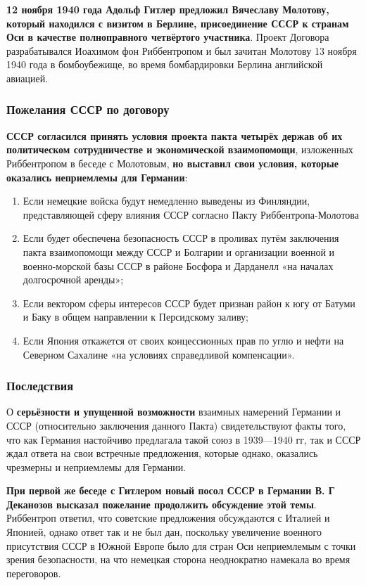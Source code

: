 \documentclass{article}
\begin{document}
\hfill

\textbf{12 ноября 1940 года Адольф Гитлер предложил Вячеславу Молотову, который находился с визитом в Берлине, присоединение СССР к странам Оси в качестве полноправного четвёртого участника}. Проект Договора разрабатывался Иоахимом фон Риббентропом и был зачитан Молотову 13 ноября 1940 года в бомбоубежище, во время бомбардировки Берлина английской авиацией. 

\subsubsection{Пожелания СССР по договору}

\textbf{СССР согласился принять условия проекта пакта четырёх держав об их политическом сотрудничестве и экономической взаимопомощи}, изложенных Риббентропом в беседе с Молотовым, \textbf{но выставил свои условия, которые оказались неприемлемы для Германии}:

\begin{enumerate}
    \item Если немецкие войска будут немедленно выведены из Финляндии, представляющей сферу влияния СССР согласно Пакту Риббентропа-Молотова
    \item Если будет обеспечена безопасность СССР в проливах путём заключения пакта взаимопомощи между СССР и Болгарии и организации военной и военно-морской базы СССР в районе Босфора и Дарданелл «на началах долгосрочной аренды»;
    \item Если вектором сферы интересов СССР будет признан район к югу от Батуми и Баку в общем направлении к Персидскому заливу;
    \item Если Япония откажется от своих концессионных прав по углю и нефти на Северном Сахалине «на условиях справедливой компенсации».
\end{enumerate}

\subsubsection{Последствия}

О \textbf{серьёзности и упущенной возможности} взаимных намерений Германии и СССР (относительно заключения данного Пакта) свидетельствуют факты того, что как Германия настойчиво предлагала такой союз в 1939—1940 гг, так и СССР ждал ответа на свои встречные предложения, которые однако, оказались чрезмерны и неприемлемы для Германии.

\textbf{При первой же беседе с Гитлером новый посол СССР в Германии В. Г Деканозов высказал пожелание продолжить обсуждение этой темы}. Риббентроп ответил, что советские предложения обсуждаются с Италией и Японией, однако ответ так и не был дан, поскольку увеличение военного присутствия СССР в Южной Европе было для стран Оси неприемлемым с точки зрения безопасности, на что немецкая сторона неоднократно намекала во время переговоров.
\end{document}

